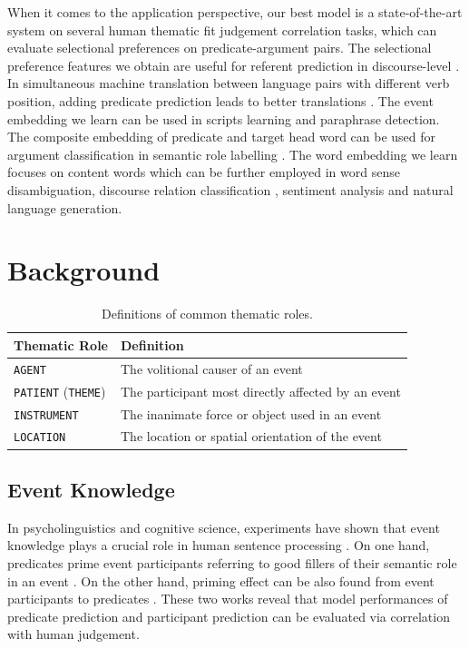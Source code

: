 \documentclass[a4paper]{article}
\begin{document}
When it comes to the application perspective, our best model is a state-of-the-art system on several human thematic fit judgement correlation tasks, which can evaluate selectional preferences on predicate-argument pairs. The selectional preference features we obtain are useful for referent prediction in discourse-level \citep{modi2017modeling}. In simultaneous machine translation between language pairs with different verb position, adding predicate prediction leads to better translations \citep{grissom2014don}. The event embedding we learn can be used in scripts learning and paraphrase detection. The composite embedding of predicate and target head word can be used for argument classification in semantic role labelling \citep{roth2016neural}. The word embedding we learn focuses on content words which can be further employed in word sense disambiguation, discourse relation classification \citep{shi2017need, rutherford2017systematic}, sentiment analysis and natural language generation. 


 
\section{Background}


\begin{table}[t]
\centering
\begin{tabular}{ll}
\textbf{Thematic Role}  &   \textbf{Definition} \\ \hline
\texttt{AGENT}                      &   The volitional causer of an event \\
\texttt{PATIENT} (\texttt{THEME})   &   The participant most directly affected by an event \\
\texttt{INSTRUMENT}                 &   The inanimate force or object used in an event \\
\texttt{LOCATION}                   &   The location or spatial orientation of the event \\
\end{tabular}
\caption{\label{tab:thematic} Definitions of common thematic roles.}
\end{table}


\subsection{Event Knowledge} \label{sec:event}
In psycholinguistics and cognitive science, experiments have shown that event knowledge plays a crucial role in human sentence processing \citep{camblin2007interplay}. On one hand, predicates prime event participants referring to good fillers of their semantic role in an event \citep{ferretti2001integrating}. On the other hand, priming effect can be also found from event participants to predicates \citep{mcrae2005basis}. These two works reveal that model performances of predicate prediction and participant prediction can be evaluated via correlation with human judgement. 
\end{document}
